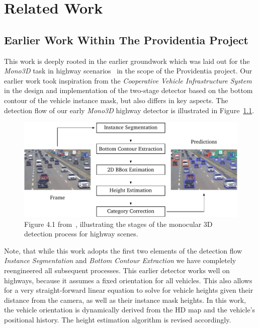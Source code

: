 
\chapter{Related Work}
\label{ch:related}

\section{Earlier Work Within The Providentia Project}
\label{sec:related-leon}

This work is deeply rooted in the earlier groundwork which was laid out for the \textit{Mono3D} task in highway scenarios~\cite{leonthesis} in the scope of the Providentia project.
Our earlier work took inspiration from the \textit{Cooperative Vehicle Infrastructure System}~\cite{guo2021detection} in the design and implementation of the two-stage detector based on the bottom contour of the vehicle instance mask, but also differs in key aspects.
The detection flow of our early \textit{Mono3D} highway detector is illustrated in Figure~\ref{fig:related-leon}.

\begin{figure}[htb]
    \centering
    \includegraphics[width=0.9\linewidth]{figures/thesis_leon_fig_4_1}
    \caption{Figure 4.1 from~\cite{leonthesis}, illustrating the stages of the monocular 3D detection process for highway scenes.}
    \label{fig:related-leon}
\end{figure}

Note, that while this work adopts the first two elements of the detection flow \textemdash \textit{Instance Segmentation} and \textit{Bottom Contour Extraction} \textemdash we have completely reengineered all subsequent processes.
This earlier detector works well on highways, because it assumes a fixed orientation for all vehicles.
This also allows for a very straight-forward linear equation to solve for vehicle heights given their distance from the camera, as well as their instance mask heights.
In this work, the vehicle orientation is dynamically derived from the HD map and the vehicle's positional history.
The height estimation algorithm is revised accordingly.

